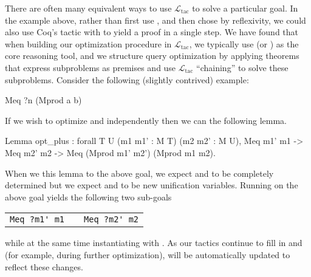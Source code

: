 \documentclass[preprint]{sigplanconf}
\newcommand{\ltac}[0]{\ensuremath{\mathcal{L}_{\mathrm{tac}}}}
\begin{document}
There are often many equivalent ways to use \ltac{} to solve a particular goal.  In the example above, rather than first use , and then chose  by reflexivity, we could also use Coq's  tactic with  to yield a proof in a single step.  We have found that when building our optimization procedure in \ltac{}, we typically use  (or ) as the core reasoning tool, and we structure query optimization by applying theorems that express subproblems as premises and use \ltac{} ``chaining'' to solve these subproblems.  Consider the following (slightly contrived) example:





\begin{coq}
Meq ?n (Mprod a b)
\end{coq}
If we wish to optimize  and  independently then we can  the following lemma.
\begin{coq}
Lemma opt_plus : forall {T U} (m1 m1' : M T) (m2 m2' : M U),
  Meq m1' m1 ->
  Meq m2' m2 ->
  Meq (Mprod m1' m2') (Mprod m1 m2).
\end{coq}
When we  this lemma to the above goal, we expect  and  to be completely determined but we expect  and  to be new unification variables.
Running  on the above goal yields the following two sub-goals
\begin{center}
\begin{tabular}{ccc}
\lstinline!Meq ?m1' m1! & \qquad & \lstinline!Meq ?m2' m2! \\
\end{tabular}
\end{center}
while at the same time instantiating  with .
As our tactics continue to fill in  and  (for example, during further optimization),  will be automatically updated to reflect these changes.  
\end{document}

